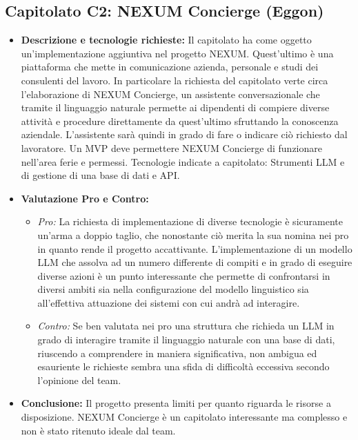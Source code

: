 \documentclass[12pt,a4paper]{article}
\newcommand{\tightlist}{\setlength{\itemsep}{1pt}\setlength{\parskip}{0pt}}
\begin{document}
\hypertarget{capitolato-c2}{%
\subsection{Capitolato C2: NEXUM Concierge (Eggon)}}
\begin{itemize}
\tightlist
\item \textbf{Descrizione e tecnologie richieste:} Il capitolato ha come oggetto un’implementazione aggiuntiva nel progetto NEXUM.
Quest'ultimo è una piattaforma che mette in comunicazione azienda, personale e studi dei consulenti del lavoro.
In particolare la richiesta del capitolato verte circa l’elaborazione di NEXUM Concierge, un assistente conversazionale che tramite il linguaggio naturale permette ai dipendenti di compiere diverse attività e procedure direttamente da quest’ultimo sfruttando la conoscenza aziendale. L’assistente sarà quindi in grado di fare o indicare ciò richiesto dal lavoratore. Un MVP deve permettere NEXUM Concierge di funzionare nell’area ferie e permessi.
Tecnologie indicate a capitolato:
Strumenti LLM e di gestione di una base di dati e API. 
\item \textbf{Valutazione Pro e Contro:}
  \begin{itemize}
  \tightlist
  \item \emph{Pro:} La richiesta di implementazione di diverse tecnologie è sicuramente un'arma a doppio taglio, che nonostante ciò merita la sua nomina nei pro in quanto rende il progetto accattivante.
L’implementazione di un modello LLM che assolva ad un numero differente di compiti e in grado di eseguire diverse azioni è un punto interessante che permette di confrontarsi in diversi ambiti sia nella configurazione del modello linguistico sia all'effettiva attuazione dei sistemi con cui andrà ad interagire.

  \item \emph{Contro:} Se ben valutata nei pro una struttura che richieda un LLM in grado di interagire tramite il linguaggio naturale con una base di dati, riuscendo a comprendere in maniera significativa, non ambigua ed esauriente le richieste sembra una sfida di difficoltà eccessiva secondo l’opinione del team.

  \end{itemize}
\item \textbf{Conclusione:} Il progetto presenta limiti per quanto riguarda le risorse a disposizione. NEXUM Concierge è un capitolato interessante ma complesso e non è stato ritenuto ideale dal team. 

\end{itemize}
\end{document}
